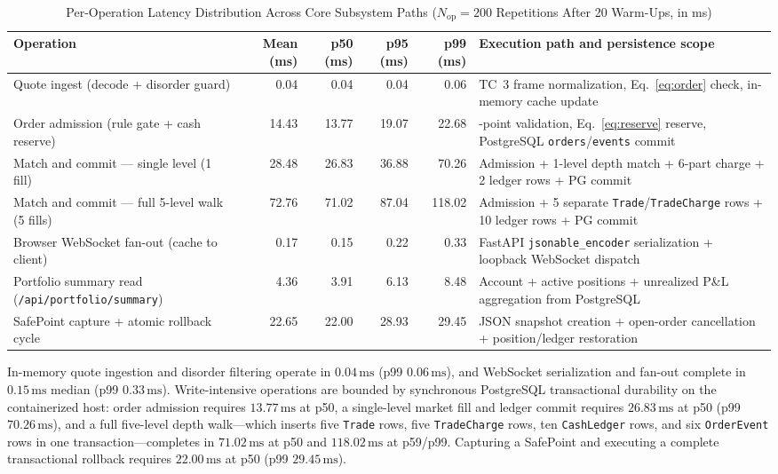 \documentclass[journal,onecolumn,10pt]{IEEEtran}
\newcommand{\thinunit}[2]{#1\,\text{#2}}
\begin{document}
\begin{table}[!t]
\caption{Per-Operation Latency Distribution Across Core Subsystem Paths ($N_{\mathrm{op}}=200$ Repetitions After 20 Warm-Ups, in ms)}
\label{tab:latency}
\centering
\small
\renewcommand{\arraystretch}{1.12}
\begin{tabularx}{\textwidth}{@{}>{\raggedright\arraybackslash}p{2.35in} r r r r >{\raggedright\arraybackslash}X@{}}
\toprule
Operation & Mean (ms) & p50 (ms) & p95 (ms) & p99 (ms) & Execution path and persistence scope \\
\midrule
Quote ingest (decode + disorder guard) & 0.04 & 0.04 & 0.04 & 0.06 & TC~3 frame normalization, Eq.~\eqref{eq:order} check, in-memory cache update \\
Order admission (rule gate + cash reserve) & 14.43 & 13.77 & 19.07 & 22.68 & 8-point validation, Eq.~\eqref{eq:reserve} reserve, PostgreSQL \texttt{orders}/\texttt{events} commit \\
Match and commit --- single level (1 fill) & 28.48 & 26.83 & 36.88 & 70.26 & Admission + 1-level depth match + 6-part charge + 2 ledger rows + PG commit \\
Match and commit --- full 5-level walk (5 fills) & 72.76 & 71.02 & 87.04 & 118.02 & Admission + 5 separate \texttt{Trade}/\texttt{TradeCharge} rows + 10 ledger rows + PG commit \\
Browser WebSocket fan-out (cache to client) & 0.17 & 0.15 & 0.22 & 0.33 & FastAPI \texttt{jsonable\_encoder} serialization + loopback WebSocket dispatch \\
Portfolio summary read (\texttt{/api/portfolio/summary}) & 4.36 & 3.91 & 6.13 & 8.48 & Account + active positions + unrealized P\&L aggregation from PostgreSQL \\
SafePoint capture + atomic rollback cycle & 22.65 & 22.00 & 28.93 & 29.45 & JSON snapshot creation + open-order cancellation + position/ledger restoration \\
\bottomrule
\end{tabularx}
\end{table}

In-memory quote ingestion and disorder filtering operate in $\thinunit{0.04}{ms}$ (p99 $\thinunit{0.06}{ms}$), and WebSocket serialization and fan-out complete in $\thinunit{0.15}{ms}$ median (p99 $\thinunit{0.33}{ms}$). Write-intensive operations are bounded by synchronous PostgreSQL transactional durability on the containerized host: order admission requires $\thinunit{13.77}{ms}$ at p50, a single-level market fill and ledger commit requires $\thinunit{26.83}{ms}$ at p50 (p99 $\thinunit{70.26}{ms}$), and a full five-level depth walk—which inserts five \texttt{Trade} rows, five \texttt{TradeCharge} rows, ten \texttt{CashLedger} rows, and six \texttt{OrderEvent} rows in one transaction—completes in $\thinunit{71.02}{ms}$ at p50 and $\thinunit{118.02}{ms}$ at p59/p99. Capturing a SafePoint and executing a complete transactional rollback requires $\thinunit{22.00}{ms}$ at p50 (p99 $\thinunit{29.45}{ms}$).
\end{document}
